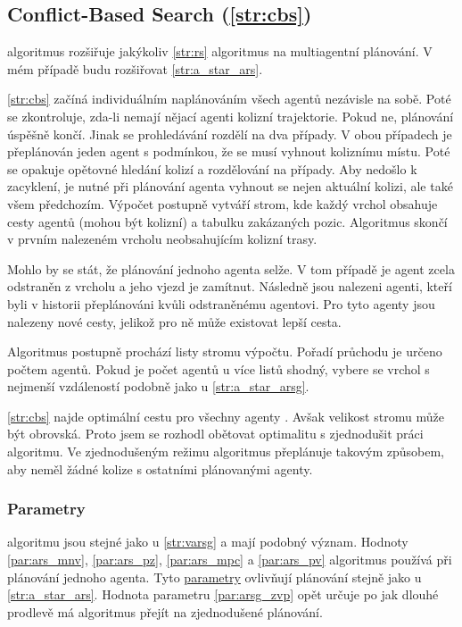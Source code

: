 \subsection{Conflict-Based Search (\ref{str:cbs})}\label{subsec:conflict_based_search}


 algoritmus \citep*{Sharon} rozšiřuje jakýkoliv \ref{str:rs} algoritmus
na multiagentní plánování.
V mém případě budu rozšiřovat \ref{str:a_star_ars}.

\ref{str:cbs} začíná individuálním naplánováním všech agentů nezávisle na sobě.
Poté se zkontroluje, zda-li nemají nějací agenti kolizní trajektorie.
Pokud ne, plánování úspěšně končí.
Jinak se prohledávání rozdělí na dva případy.
V obou případech je přeplánován jeden agent s podmínkou, že se musí vyhnout koliznímu místu.
Poté se opakuje opětovné hledání kolizí a rozdělování na případy.
Aby nedošlo k zacyklení, je nutné při plánování agenta vyhnout se nejen aktuální kolizi, ale také všem předchozím.
Výpočet postupně vytváří strom, kde každý vrchol obsahuje cesty agentů (mohou být kolizní) a tabulku zakázaných pozic.
Algoritmus skončí v prvním nalezeném vrcholu neobsahujícím kolizní trasy.

Mohlo by se stát, že plánování jednoho agenta selže.
V tom případě je agent zcela odstraněn z vrcholu a jeho vjezd je zamítnut.
Následně jsou nalezeni agenti, kteří byli v historii přeplánováni kvůli odstraněnému agentovi.
Pro tyto agenty jsou nalezeny nové cesty, jelikož pro ně může existovat lepší cesta.

Algoritmus postupně prochází listy stromu výpočtu.
Pořadí průchodu je určeno počtem agentů.
Pokud je počet agentů u více listů shodný, vybere se vrchol s nejmenší vzdáleností podobně jako u \ref{str:a_star_arsg}.

\ref{str:cbs} najde optimální cestu pro všechny agenty \citep{Sharon}.
Avšak velikost stromu může být obrovská.
Proto jsem se rozhodl obětovat optimalitu s zjednodušit práci algoritmu.
Ve zjednodušeným režimu algoritmus přeplánuje takovým způsobem, aby neměl žádné kolize s ostatními plánovanými agenty.

\subsubsection{Parametry}\label{subsubsec:cbs_parametry}

 algoritmu jsou stejné jako u \ref{str:varsg} a mají podobný význam.
Hodnoty \ref{par:ars_mnv}, \ref{par:ars_pz}, \ref{par:ars_mpc} a \ref{par:ars_pv}
algoritmus používá při plánování jednoho agenta.
Tyto \hyperref[subsubsec:ars_parametry]{parametry} ovlivňují plánování stejně jako u \ref{str:a_star_ars}.
Hodnota parametru \ref{par:arsg_zvp} opět určuje po jak dlouhé prodlevě má algoritmus přejít na zjednodušené plánování.

